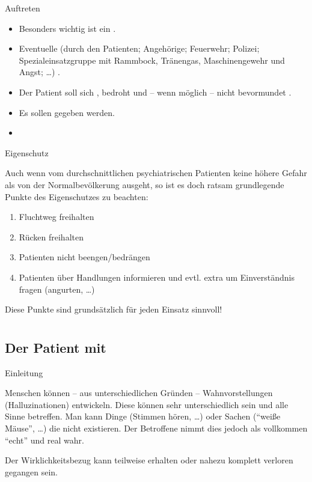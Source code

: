\Text
{Auftreten}%
{%
\begin{itemize}
    \item Besonders wichtig ist ein .
    \item  Eventuelle  (durch den
    Patienten; Angehörige; Feuerwehr; Polizei;
    Spezialeinsatzgruppe mit Rammbock, Tränengas,
    Maschinengewehr und Angst; \ldots) .
    \item Der Patient soll sich ,
    bedroht und -- wenn möglich -- nicht bevormundet
    .
    \item Es sollen  gegeben werden.
   \item {}
\end{itemize}
}%

\Text
{Eigenschutz}%
{%
Auch wenn vom durchschnittlichen
psychiatrischen Patienten keine höhere Gefahr als von der
Normalbevölkerung ausgeht, so ist es doch ratsam
grundlegende Punkte des Eigenschutzes zu beachten:

\begin{enumerate}
    \item Fluchtweg freihalten
    \item Rücken freihalten
    \item Patienten nicht beengen/bedrängen
    \item Patienten über Handlungen informieren und evtl.
    extra um Einverständnis fragen (angurten, \ldots)
\end{enumerate}


Diese Punkte sind grundsätzlich für jeden Einsatz sinnvoll!
}%



\section{}

\subsection{Der Patient mit }

\Text
{Einleitung}%
{%
Menschen können -- aus unterschiedlichen Gründen --
Wahnvorstellungen (Halluzinationen) entwickeln. Diese
können sehr unterschiedlich sein und alle Sinne betreffen.
Man kann Dinge  (Stimmen hören, \ldots)  oder
Sachen  (\enquote{weiße Mäuse}, \ldots) die nicht
existieren. Der Betroffene nimmt dies jedoch als vollkommen
\enquote{echt} und real wahr. 

Der Wirklichkeitsbezug kann teilweise erhalten oder nahezu
komplett verloren gegangen sein. 
}%



